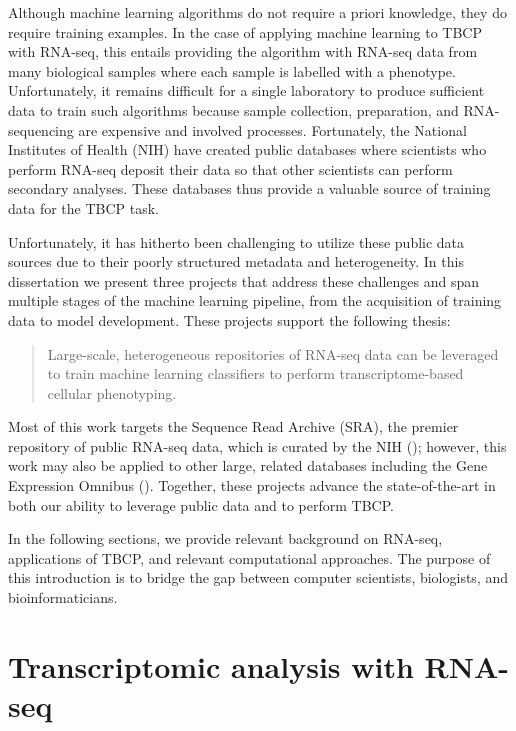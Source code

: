 Although machine learning algorithms do not require a priori knowledge, they do require training examples.  In the case of applying machine learning to TBCP with RNA-seq, this entails providing the algorithm with RNA-seq data from many biological samples where each sample is labelled with a phenotype.  Unfortunately, it remains difficult for a single laboratory to produce sufficient data to train such algorithms because sample collection, preparation, and RNA-sequencing are expensive and involved processes. Fortunately, the National Institutes of Health (NIH) have created public databases where scientists who perform RNA-seq deposit their data so that other scientists can perform secondary analyses. These databases thus provide a valuable source of training data for the TBCP task.

Unfortunately, it has hitherto been challenging to utilize these public data sources due to their poorly structured metadata and heterogeneity.  In this dissertation we present three projects that address these challenges and span multiple stages of the machine learning pipeline, from the acquisition of training data to model development. These projects support the following thesis:
\begin{quote}
Large-scale, heterogeneous repositories of RNA-seq data can be leveraged to train machine learning classifiers to perform transcriptome-based cellular phenotyping.
\end{quote}
Most of this work targets the Sequence Read Archive (SRA), the premier repository of public RNA-seq data, which is curated by the NIH (\citealp{Leinonen2011}); however, this work may also be applied to other large, related databases including the Gene Expression Omnibus (\citealp{Barrett2013}).  Together, these projects advance the state-of-the-art in both our ability to leverage public data and to perform TBCP. 

In the following sections, we provide relevant background on RNA-seq, applications of TBCP, and relevant computational approaches.  The purpose of this introduction is to bridge the gap between computer scientists, biologists, and bioinformaticians.



\section{Transcriptomic analysis with RNA-seq}

